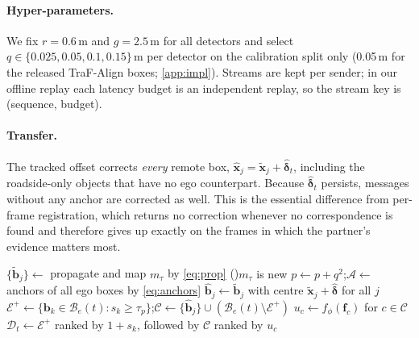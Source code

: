 \paragraph{Hyper-parameters.}
We fix $r=0.6$\,m and $g=2.5$\,m for all detectors and select $q\in\{0.025,0.05,0.1,0.15\}$\,m per detector on the calibration split only (0.05\,m for the released TraF-Align boxes; \cref{app:impl}).
Streams are kept per sender; in our offline replay each latency budget is an independent replay, so the stream key is (sequence, budget).

\paragraph{Transfer.}
The tracked offset corrects \emph{every} remote box, $\hat{\mathbf x}_j=\tilde{\mathbf x}_j+\hat{\boldsymbol\delta}_t$, including the roadside-only objects that have no ego counterpart.
Because $\hat{\boldsymbol\delta}_t$ persists, messages without any anchor are corrected as well.
This is the essential difference from per-frame registration, which returns no correction whenever no correspondence is found and therefore gives up exactly on the frames in which the partner's evidence matters most.

\begin{algorithm}[t]
  \caption{\method on the receiver at decision time $t$}
  \label{alg:comet}
  \small
  $\{\tilde{\mathbf b}_j\}\leftarrow$ propagate and map $m_\tau$ by \cref{eq:prop}\;
  \If(){$m_\tau$ is new}{
    $p\leftarrow p+q^2$;\quad $\mathcal A\leftarrow$ anchors of all ego boxes by \cref{eq:anchors}\;
  }
  $\hat{\mathbf b}_j\leftarrow\tilde{\mathbf b}_j$ with centre $\tilde{\mathbf x}_j+\hat{\boldsymbol\delta}$ for all $j$
  $\mathcal E^+\leftarrow\{\mathbf b_k\in\mathcal B_e(t):s_k\ge\tau_p\}$;\quad $\mathcal C\leftarrow\{\hat{\mathbf b}_j\}\cup(\mathcal B_e(t)\setminus\mathcal E^+)$\;
  $u_c\leftarrow f_\phi(\mathbf f_c)$ for $c\in\mathcal C$
  $\mathcal D_t\leftarrow\mathcal E^+$ ranked by $1+s_k$, followed by $\mathcal C$ ranked by $u_c$\;
\end{algorithm}

